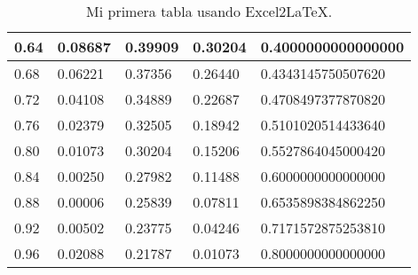 \documentclass[12pt]{article}
\begin{document}
\begin{table}[h]
\begin{tabular}{|l|l|l|l|l|}
0.64     & 0.08687                   & 0.39909         & 0.30204       & 0.4000000000000000 \\\hline
0.68     & 0.06221                   & 0.37356         & 0.26440       & 0.4343145750507620 \\\hline
0.72     & 0.04108                   & 0.34889         & 0.22687       & 0.4708497377870820 \\\hline
0.76     & 0.02379                   & 0.32505         & 0.18942       & 0.5101020514433640 \\\hline
0.80     & 0.01073                   & 0.30204         & 0.15206       & 0.5527864045000420 \\\hline
0.84     & 0.00250                   & 0.27982         & 0.11488       & 0.6000000000000000 \\\hline
0.88     & 0.00006                   & 0.25839         & 0.07811       & 0.6535898384862250 \\\hline
0.92     & 0.00502                   & 0.23775         & 0.04246       & 0.7171572875253810 \\\hline
0.96     & 0.02088                   & 0.21787         & 0.01073       & 0.8000000000000000 \\
\hline\hline
\end{tabular}
\caption{Mi primera tabla usando Excel2LaTeX.}
\label{tab:cotas}
\end{table}
\end{document}
